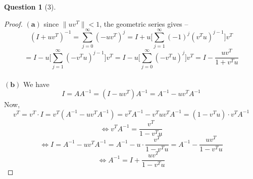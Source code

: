 \documentclass[11pt]{article}
\theoremstyle{quest}
\newtheorem*{question}{Question}
\begin{document}
\begin{question}[3]
\end{question}
\begin{proof}
$\mathbf{(a)}$ since $\|uv^T\| < 1$, the geometric series gives --
$$(I + uv^T)^{-1} = \sum_{j=0}^\infty (-uv^T)^j = I + u \Big[\sum_{j=1}^\infty (-1)^j(v^Tu)^{j-1}\Big] v^T$$
$$= I - u \Big[\sum_{j=1}^\infty (-v^Tu)^{j-1}\Big] v^T = I - u \Big[\sum_{j=0}^\infty (-v^Tu)^j\Big] v^T = I - \dfrac{uv^T}{1 + v^Tu}$$
\\$\mathbf{(b)}$ We have
$$I = AA^{-1} = (I - uv^T)A^{-1} = A^{-1} - uv^TA^{-1}$$
Now,
$$v^T = v^T \cdot I = v^T(A^{-1} - uv^TA^{-1}) = v^T A^{-1} - v^Tuv^TA^{-1} = (1 - v^Tu) \cdot v^TA^{-1}$$
$$\iff v^TA^{-1} = \dfrac{v^T}{1 - v^Tu}$$
$$\iff I = A^{-1} - uv^TA^{-1} = A^{-1} - u \cdot \dfrac{v^T}{1 - v^Tu} = A^{-1} - \dfrac{uv^T}{1 - v^Tu}$$
$$\iff A^{-1} = I + \dfrac{uv^T}{1 - v^Tu}$$
\end{proof}
\end{document}
